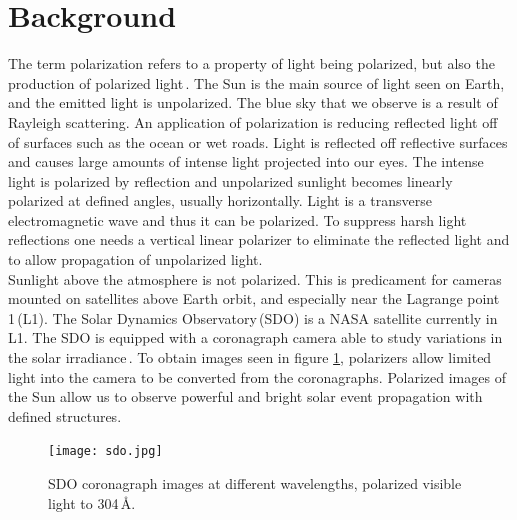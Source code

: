 \documentclass[aps,prl,twocolumn,superscriptaddress,nofootinbib]{revtex4-1}
\begin{document}
\maketitle    %


\section{Background}

The term polarization refers to a property of light being polarized, but also the production of polarized light\,\cite{2}. The Sun is the main source of light seen on Earth, and the emitted light is unpolarized. The blue sky that we observe is a result of Rayleigh scattering. An application of polarization is reducing reflected light off of surfaces such as the ocean or wet roads. Light is reflected off reflective surfaces and causes large amounts of intense light projected into our eyes. The intense light is polarized by reflection and unpolarized sunlight becomes linearly polarized at defined angles, usually horizontally. Light is a transverse electromagnetic wave and thus it can be polarized. To suppress harsh light reflections one needs a vertical linear polarizer to eliminate the reflected light and to allow propagation of unpolarized light.
\\
\indent Sunlight above the atmosphere is not polarized. This is predicament for cameras mounted on satellites above Earth orbit, and especially near the Lagrange point 1\,(L1). The Solar Dynamics Observatory\,(SDO) is a NASA satellite currently in L1. The SDO is equipped with a coronagraph camera able to study variations in the solar irradiance\,\cite{3}. To obtain images seen in figure \ref{sdo}, polarizers allow limited light into the camera to be converted from the coronagraphs. Polarized images of the Sun allow us to observe powerful and bright solar event propagation with defined structures.

\begin{figure}[h!]
  \begin{center}
\centerline{\texttt{[image: sdo.jpg]}}
\caption{\small{SDO coronagraph images at different wavelengths, polarized visible light to 304\,\AA. \label{sdo}}}
  \end{center}
\end{figure}
\end{document}
